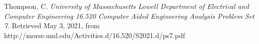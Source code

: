 \documentclass{report}
\begin{document}
\newpage

	\begin{thebibliography}{99\kern\bibindent}
	
	Thompson, C.
	\textit{University of Massachusetts Lowell Department of Electrical and Computer Engineering 16.520 Computer Aided Engineering Analysis Problem Set 7}.
	Retrieved May 3, 2021, from http://morse.uml.edu/Activities.d/16.520/S2021.d/ps7.pdf
	
	\end{thebibliography}
\end{document}
